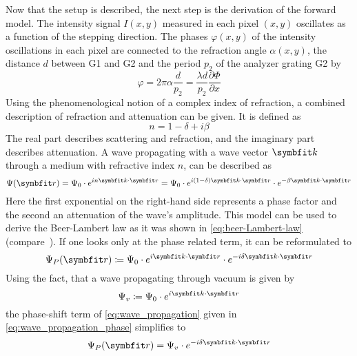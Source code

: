 Now that the setup is described, the next step is the derivation of the forward model. The intensity
signal \(I(x, y)\) measured in each pixel \((x, y)\) oscillates as a function of the stepping
direction. The phases \(\varphi(x, y)\) of the intensity oscillations in each pixel are connected to
the refraction angle \(\alpha(x, y)\), the distance \(d\) between G1 and G2 and the period \(p_2\)
of the analyzer grating G2 by~\cite{weitkamp_x-ray_2005}
\begin{equation}
	\varphi = 2 \pi \alpha \frac{d}{p_2} = \frac{\lambda d}{p_2} \frac{\partial \Phi}{\partial x}
\end{equation}
Using the phenomenological notion of a complex index of refraction, a combined description of
refraction and attenuation can be given. It is defined as
\begin{equation}
	n = 1 - \delta + i \beta
\end{equation}
The real part describes scattering and refraction, and the imaginary part describes attenuation. A
wave propagating with a wave vector \(\mvec{k}\) through a medium with refractive index \(n\), can
be described as
\begin{equation}\label{eq:wave_propagation}
	\Psi(\mvec{r}) = \Psi_0 \cdot e^{i n \mvec{k} \cdot \mvec{r}} = \Psi_0 \cdot e^{i(1-\delta)\mvec{k} \cdot \mvec{r}} \cdot e^{-\beta \mvec{k} \cdot \mvec{r}}
\end{equation}
Here the first exponential on the right-hand side represents a phase factor and the second an
attenuation of the wave's amplitude. This model can be used to derive the Beer-Lambert law as it was
shown in \autoref{eq:beer-Lambert-law} (compare~\cite[Chapter~2.1]{hahn_statistical_2014}). If one
looks only at the phase related term, it can be reformulated to
\begin{equation}\label{eq:wave_propagation_phase}
	\Psi_P(\mvec{r}) \coloneq \Psi_0 \cdot e^{i \mvec{k} \cdot \mvec{r}} \cdot e^{-i\delta \mvec{k} \cdot \mvec{r}}
\end{equation}
Using the fact, that a wave propagating through vacuum is given by
\begin{equation}
	\Psi_v \coloneq \Psi_0 \cdot e^{i \mvec{k} \cdot \mvec{r}}
\end{equation}
the phase-shift term of \autoref{eq:wave_propagation} given in \autoref{eq:wave_propagation_phase}
simplifies to
\begin{equation}
	\Psi_P(\mvec{r}) = \Psi_v \cdot e^{-i\delta \mvec{k} \cdot \mvec{r}}
\end{equation}
